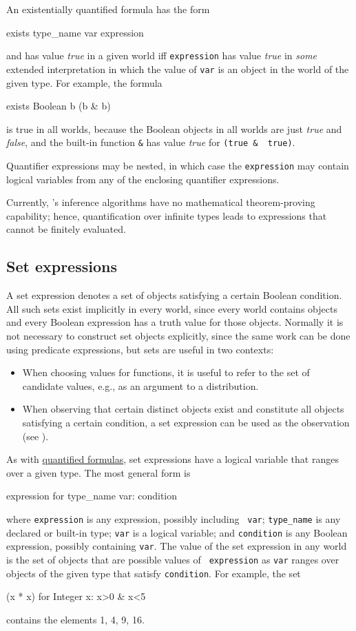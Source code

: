 \documentclass[12pt]{article}
\begin{document}
An existentially quantified formula has the form
\begin{blogcode}
exists type_name var expression
\end{blogcode}
and has value {\it true}
in a given world iff {\tt expression} has value {\it true}
in {\em some} extended interpretation in which the value of {\tt var} 
is an object in the world of the given type. For example, the formula
\begin{blogcode}
exists Boolean b (b & b)
\end{blogcode}
is true in all worlds, because the Boolean objects in all worlds are 
just {\it true} and {\it false}, and the built-in function \verb|&| has value {\it true} for \verb|(true &  true)|.


Quantifier expressions may be nested, in which case
the {\tt expression} may contain logical variables from any of the
enclosing quantifier expressions.

Currently, \bl's inference algorithms have no mathematical
theorem-proving capability; hence, quantification over infinite types
leads to expressions that cannot be finitely evaluated.


\subsection{Set expressions}\label{set-section}
A set expression denotes a set of objects satisfying a certain
Boolean condition. All such sets exist implicitly in every world,
since every world contains objects and every Boolean expression
has a truth value for those objects. Normally it is not necessary to
construct set objects explicitly, since the same work can be done
using predicate expressions, but sets are useful in two contexts:
\begin{itemize}
\item When choosing values for functions, it is useful to refer to the
  set of candidate values, e.g., as an argument to a distribution.
\item When observing that certain distinct objects exist
and constitute all objects satisfying a certain condition,
a set expression can be used as the observation (see ).
\end{itemize}
As with \hyperref[quantifier-section]{quantified formulas}, set
expressions have a logical variable that ranges over a given type.
The most general form is
\begin{blogcode}
{expression for type_name var: condition}
\end{blogcode}
where {\tt expression} is any expression, possibly including {\tt
  var}; \verb|type_name| is any declared or built-in type; {\tt var} is
a logical variable; and {\tt condition} is any Boolean expression,
possibly containing {\tt var}. The value of the set expression in any
world is the set of objects that are possible values of {\tt
  expression} as {\tt var} ranges over objects of the given type
that satisfy {\tt condition}. For example, the set
\begin{blogcode}
{(x * x) for Integer x: x>0 & x<5}
\end{blogcode}
contains the elements 1, 4, 9, 16.
\end{document}
